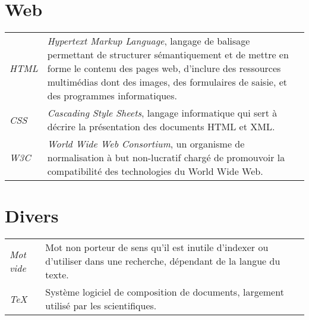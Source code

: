 \section{Web}
	\begin{longtable}{>{\itshape}p{}p{}}
		HTML		& \textit{Hypertext Markup Language}, langage de balisage permettant de structurer sémantiquement et de mettre en forme le contenu des pages web, d’inclure des ressources multimédias dont des images, des formulaires de saisie, et des programmes informatiques.
		\vspace{2mm}\\
		CSS		& \textit{Cascading Style Sheets}, langage informatique qui sert à décrire la présentation des documents HTML et XML.
		\vspace{2mm}\\
		W3C 		& \textit{World Wide Web Consortium}, un organisme de normalisation à but non-lucratif chargé de promouvoir la compatibilité des technologies du World Wide Web.
	\end{longtable}



\section{Divers}
	\begin{longtable}{>{\itshape}p{}p{}}
		Mot vide	& Mot non porteur de sens qu'il est inutile d'indexer ou d'utiliser dans une recherche, dépendant de la langue du texte.
		\vspace{2mm}\\
		\TeX		& Système logiciel de composition de documents, largement utilisé par les scientifiques.
	\end{longtable}
